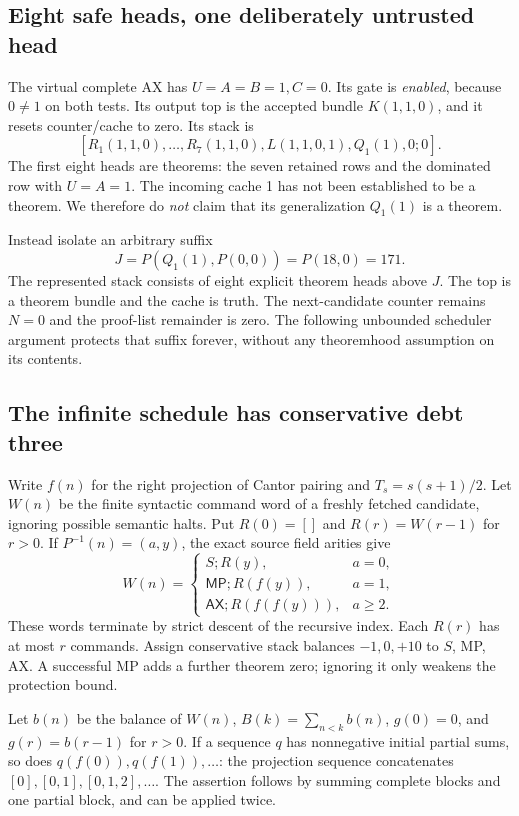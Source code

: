 \subsection{Eight safe heads, one deliberately untrusted head}
The virtual complete AX has $U=A=B=1,C=0$. Its gate is \emph{enabled}, because $0\ne1$ on both tests. Its output top is the accepted bundle $K(1,1,0)$, and it resets counter/cache to zero. Its stack is
\[
[R_1(1,1,0),\ldots,R_7(1,1,0),L(1,1,0,1),Q_1(1),0;0].
\]
The first eight heads are theorems: the seven retained rows and the dominated row with $U=A=1$. The incoming cache 1 has not been established to be a theorem. We therefore do \emph{not} claim that its generalization $Q_1(1)$ is a theorem.

Instead isolate an arbitrary suffix
\[
       J=P(Q_1(1),P(0,0))=P(18,0)=171.
\]
The represented stack consists of eight explicit theorem heads above $J$. The top is a theorem bundle and the cache is truth. The next-candidate counter remains $N=0$ and the proof-list remainder is zero. The following unbounded scheduler argument protects that suffix forever, without any theoremhood assumption on its contents.

\subsection{The infinite schedule has conservative debt three}
Write $f(n)$ for the right projection of Cantor pairing and $T_s=s(s+1)/2$. Let $W(n)$ be the finite syntactic command word of a freshly fetched candidate, ignoring possible semantic halts. Put $R(0)=[]$ and $R(r)=W(r-1)$ for $r>0$. If $P^{-1}(n)=(a,y)$, the exact source field arities give
\[
W(n)=\begin{cases}
S;R(y),&a=0,\\
\mathsf{MP};R(f(y)),&a=1,\\
\mathsf{AX};R(f(f(y))),&a\ge2.
\end{cases}
\]
These words terminate by strict descent of the recursive index. Each $R(r)$ has at most $r$ commands. Assign conservative stack balances $-1,0,+10$ to $S$, MP, AX. A successful MP adds a further theorem zero; ignoring it only weakens the protection bound.

Let $b(n)$ be the balance of $W(n)$, $B(k)=\sum_{n<k}b(n)$, $g(0)=0$, and $g(r)=b(r-1)$ for $r>0$. If a sequence $q$ has nonnegative initial partial sums, so does $q(f(0)),q(f(1)),\ldots$: the projection sequence concatenates $[0],[0,1],[0,1,2],\ldots$. The assertion follows by summing complete blocks and one partial block, and can be applied twice.

